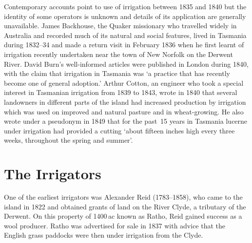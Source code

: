 Contemporary accounts point to use of irrigation between 1835 and 1840
but the identity of some operators is unknown and details of its
application are generally unavailable.  James Backhouse, the Quaker
missionary who travelled widely in Australia and recorded much of its
natural and social features, lived in Tasmania during 1832--34 and
made a return visit in February 1836 when he first learnt of
irrigation recently undertaken near the town of New Norfolk on the
Derwent River.  David Burn's well-informed
articles were published in London during 1840, with the claim that
irrigation in Tasmania was `a practice that has recently become one of
general adoption.'  Arthur Cotton, an engineer who took a special interest in
Tasmanian irrigation from 1839 to 1843, wrote in 1840 that several
landowners in different parts of the island had increased production
by irrigation which was used on improved and natural pasture and in
wheat-growing.  He also wrote
under a pseudonym in 1849 that for the past~15 years in Tasmania
lucerne under irrigation had provided a cutting `about fifteen inches
high every three weeks, throughout the spring and summer'.

\section*{The Irrigators}

One of the earliest irrigators was Alexander Reid (1783--1858), who
came to the island in 1822 and obtained grants of land on the River
Clyde, a tributary of the Derwent. On this property of 1400\,ac known
as Ratho, Reid gained success as a wool producer.  Ratho was
advertised for sale in 1837 with advice that the English grass
paddocks were then under irrigation from the Clyde.

